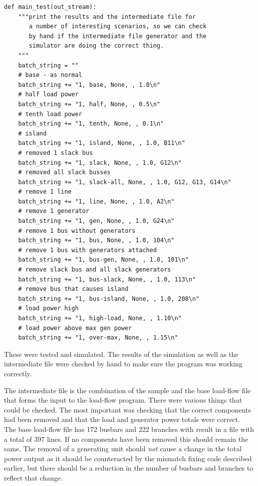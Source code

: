 \documentclass[a4paper,oneside,12pt]{report}
\begin{document}
\begin{verbatim}
def main_test(out_stream):
    """print the results and the intermediate file for
       a number of interesting scenarios, so we can check
       by hand if the intermediate file generator and the
       simulator are doing the correct thing.
    """
    batch_string = ""
    # base - as normal
    batch_string += "1, base, None, , 1.0\n"            
    # half load power
    batch_string += "1, half, None, , 0.5\n"            
    # tenth load power
    batch_string += "1, tenth, None, , 0.1\n"           
    # island
    batch_string += "1, island, None, , 1.0, B11\n"     
    # removed 1 slack bus
    batch_string += "1, slack, None, , 1.0, G12\n"      
    # removed all slack busses
    batch_string += "1, slack-all, None, , 1.0, G12, G13, G14\n"  
    # remove 1 line
    batch_string += "1, line, None, , 1.0, A2\n"        
    # remove 1 generator
    batch_string += "1, gen, None, , 1.0, G24\n"        
    # remove 1 bus without generators
    batch_string += "1, bus, None, , 1.0, 104\n"        
    # remove 1 bus with generators attached
    batch_string += "1, bus-gen, None, , 1.0, 101\n"    
    # remove slack bus and all slack generators
    batch_string += "1, bus-slack, None, , 1.0, 113\n"  
    # remove bus that causes island
    batch_string += "1, bus-island, None, , 1.0, 208\n" 
    # load power high 
    batch_string += "1, high-load, None, , 1.10\n"      
    # load power above max gen power
    batch_string += "1, over-max, None, , 1.15\n"       
\end{verbatim}

These were tested and simulated. The results of the simulation as well
as the intermediate file were checked by hand to make sure the program
was working correctly.

The intermediate file is the combination of the sample and the base
load-flow file that forms the input to the load-flow program. There were
various things that could be checked. The most important was checking
that the correct components had been removed and that the load and
generator power totals were correct. The base load-flow file has 172
busbars and 222 branches with result in a file with a total of 397
lines. If no components have been removed this should remain the same.
The removal of a generating unit should \emph{not} cause a change in the
total power output as it should be counteracted by the mismatch fixing
code described earlier, but there should be a reduction in the number of
busbars and branches to reflect that change.
\end{document}
